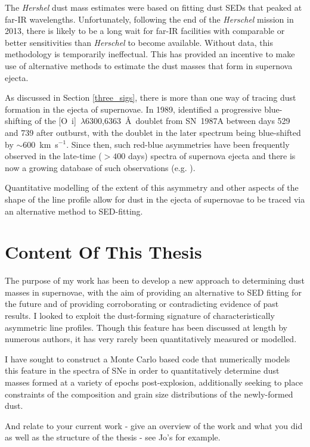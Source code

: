 The {\em Hershel} dust mass estimates were based on fitting dust SEDs that peaked at far-IR wavelengths. Unfortunately, following the end of the {\em Herschel} mission in 2013, there is likely to be a long wait for far-IR facilities with comparable or better sensitivities than {\em Herschel} to become available.  Without data, this methodology is temporarily ineffectual.  This has provided an incentive to make use of alternative methods to estimate the dust masses that form in supernova ejecta.

As discussed in Section \ref{three_sigs}, there is more than one way of tracing dust formation in the ejecta of supernovae.  In 1989, \citeauthor{Lucy1989} identified a progressive blue-shifting of the [O~{\sc i}]~$\lambda$6300,6363~\AA\ doublet from SN~1987A between days 529 and 739 after outburst, with the doublet in the later spectrum being blue-shifted by $\sim 600 $~km~s$^{-1}$. Since then, such red-blue asymmetries have been frequently observed in the late-time ($ > 400$ days) spectra of supernova ejecta and there is now a growing database of such observations (e.g. \citet{Lucy1989,Fabbri2011,Mauerhan2012,Milisavljevic2012}).

Quantitative modelling of the extent of this asymmetry and other aspects of the shape of the line profile allow for dust in the ejecta of supernovae to be traced via an alternative method to SED-fitting.  


\section{Content Of This Thesis}
The purpose of my work has been to develop a new approach to determining dust masses in supernovae, with the aim of providing an alternative to SED fitting for the future and of providing corroborating or contradicting evidence of past results.  I looked to exploit the dust-forming signature of characteristically asymmetric line profiles.  Though this feature has been discussed at length by numerous authors, it has very rarely been quantitatively measured or modelled.

I have sought to construct a Monte Carlo based code that numerically models this feature in the spectra of SNe in order to quantitatively determine dust masses formed at a variety of epochs post-explosion, additionally seeking to place constraints of the composition and grain size distributions of the newly-formed dust.

And relate to your current work - give an overview of the work and what you did as well as the structure of the thesis - see Jo's for example.
